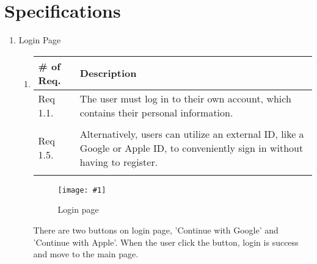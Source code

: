 \section{\Large{Specifications}}
\begin{enumerate}[label=\arabic*.]

    \newcommand{\requirementTable}[1]{
        \begin{table}[H]
            \center
            \begin{tabular}{m{1.4cm} m{5.5cm}}
                \toprule
                \# of Req. & Description \\
                \midrule
                #1
                \bottomrule
            \end{tabular}
        \end{table}
    }

    \newcommand{\addImage}[2]{
        \begin{figure}[ht]
            \begin{center}
                \texttt{[image: \#1]}
                \caption{#2} %
                \renewcommand{\thefigure}{\thesubsection.\arabic{figure}}
            \end{center}
        \end{figure}
    }


    \item {\large{Login Page}}
          \begin{enumerate}[label*={\arabic*.},ref=\theenumi.\arabic*]
              \setlength{\itemindent}{0.5cm}
              \item
                    \requirementTable{
                        Req 1.1. & The user must log in to their own account, which contains their personal information.\\\\
                        Req 1.5. & Alternatively, users can utilize an external ID, like a Google or Apple ID, to conveniently sign in without having to register.\\\\
                    }
                    \addImage{
                        imgs/specification/login_page.png
                    }{
                        Login page
                    }
                    There are two buttons on login page, 'Continue with Google' and 'Continue with Apple'. When the user click the button, login is success and move to the main page.\\\\
          \end{enumerate}


\end{enumerate}
